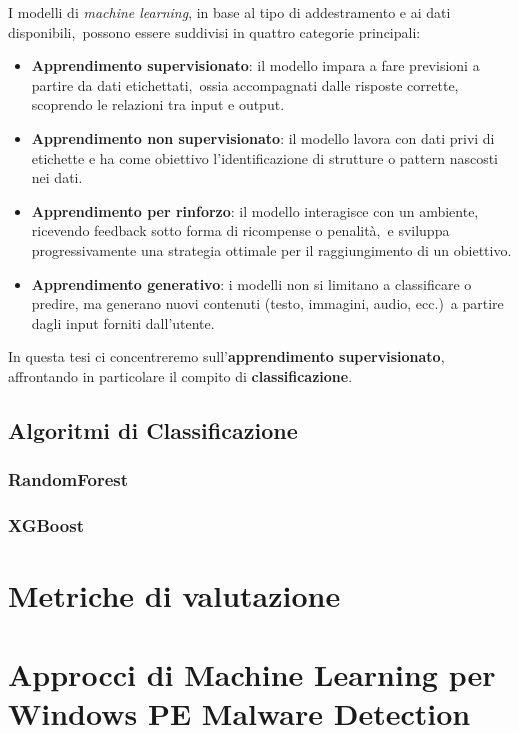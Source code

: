 I modelli di \textit{machine learning}, in base al tipo di addestramento e ai dati disponibili,\
possono essere suddivisi in quattro categorie principali:

\begin{itemize}
      \item \textbf{Apprendimento supervisionato}: il modello impara a fare previsioni a partire da dati etichettati,\
            ossia accompagnati dalle risposte corrette, scoprendo le relazioni tra input e output.
      \item \textbf{Apprendimento non supervisionato}: il modello lavora con dati privi di etichette e ha come obiettivo l'identificazione di strutture o pattern nascosti nei dati.
      \item \textbf{Apprendimento per rinforzo}: il modello interagisce con un ambiente, ricevendo feedback sotto forma di ricompense o penalità,\
            e sviluppa progressivamente una strategia ottimale per il raggiungimento di un obiettivo.
      \item \textbf{Apprendimento generativo}: i modelli non si limitano a classificare o predire, ma generano nuovi contenuti (testo, immagini, audio, ecc.)\
            a partire dagli input forniti dall'utente.
\end{itemize}

In questa tesi ci concentreremo sull'\textbf{apprendimento supervisionato}, affrontando in particolare il compito di \textbf{classificazione}.

\subsection{Algoritmi di Classificazione}

\subsubsection{RandomForest}

\subsubsection{XGBoost}

\section{Metriche di valutazione}

\section{Approcci di Machine Learning per Windows PE Malware Detection}

